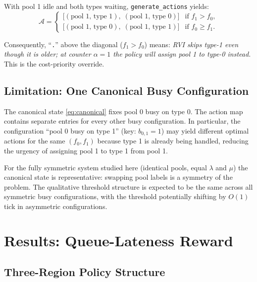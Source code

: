 \documentclass[11pt,a4paper]{article}
\begin{document}
With pool 1 idle and both types waiting, \texttt{generate\_actions} yields:
\begin{equation}
  \mathcal{A} =
  \begin{cases}
    \bigl[(\text{pool 1, type 1}),\; (\text{pool 1, type 0})\bigr]
      & \text{if } f_1 > f_0, \\[3pt]
    \bigl[(\text{pool 1, type 0}),\; (\text{pool 1, type 1})\bigr]
      & \text{if } f_0 \geq f_1.
  \end{cases}
  \label{eq:action_queue}
\end{equation}

Consequently, ``\texttt{.}'' above the diagonal ($f_1 > f_0$) means:
\emph{RVI skips type-1 even though it is older; at counter $\alpha=1$ the
policy will assign pool 1 to type-0 instead.}  This is the cost-priority
override.

\subsection{Limitation: One Canonical Busy Configuration}

The canonical state \eqref{eq:canonical} fixes pool 0 busy on type 0.  The
action map contains separate entries for every other busy configuration.
In particular, the configuration ``pool 0 busy on type 1'' (key:
$b_{0,1} = 1$) may yield different optimal actions for the same $(f_0, f_1)$
because type 1 is already being handled, reducing the urgency of assigning
pool 1 to type 1 from pool 1.

For the fully symmetric system studied here (identical pools, equal $\lambda$
and $\mu$) the canonical state is representative: swapping pool labels is a
symmetry of the problem.  The qualitative threshold structure is expected to
be the same across all symmetric busy configurations, with the threshold
potentially shifting by $O(1)$ tick in asymmetric configurations.


\section{Results: Queue-Lateness Reward}
\label{sec:results}

\subsection{Three-Region Policy Structure}
\end{document}
